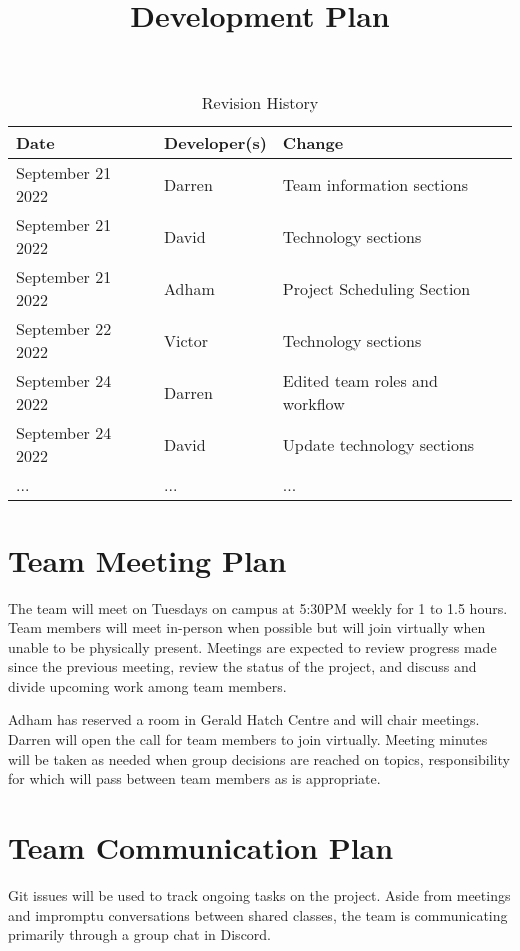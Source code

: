 \documentclass{article}
\title{Development Plan\\\progname}
\author{\authname}
\date{}
\begin{document}
\maketitle

\begin{table}[hp]
\caption{Revision History} \label{TblRevisionHistory}
\begin{tabularx}{\textwidth}{llX}
\toprule
\textbf{Date} & \textbf{Developer(s)} & \textbf{Change}\\
\midrule
September 21 2022 & Darren & Team information sections\\
September 21 2022 & David & Technology sections\\
September 21 2022 & Adham & Project Scheduling Section\\
September 22 2022 & Victor & Technology sections\\
September 24 2022 & Darren & Edited team roles and workflow\\
September 24 2022 & David & Update technology sections\\
... & ... & ...\\
\bottomrule
\end{tabularx}
\end{table}



\section{Team Meeting Plan}

The team will meet on Tuesdays on campus at 5:30PM weekly for 1 to 1.5 hours. Team members will meet in-person when possible but will join virtually when unable to be physically present. Meetings are expected to review progress made since the previous meeting, review the status of the project, and discuss and divide upcoming work among team members.

Adham has reserved a room in Gerald Hatch Centre and will chair meetings. Darren will open the call for team members to join virtually. Meeting minutes will be taken as needed when group decisions are reached on topics, responsibility for which will pass between team members as is appropriate.

\section{Team Communication Plan}

Git issues will be used to track ongoing tasks on the project. Aside from meetings and impromptu conversations between shared classes, the team is communicating primarily through a group chat in Discord.
\end{document}
